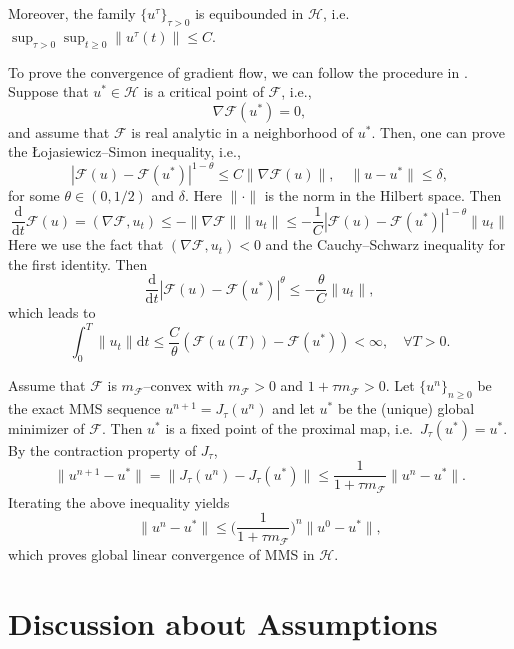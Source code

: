 \documentclass[twoside,11pt]{article}
\newcommand{\rev}[1]{#1}                           %
\newcommand{\dd}{\mathrm{d}}
\newcommand{\calF}{\mathcal{F}}
\begin{document}
Moreover, the family $\{u^\tau\}_{\tau>0}$ is equibounded in $\mathcal{H}$, i.e.
$\sup_{\tau>0}\sup_{t\ge0}\|u^\tau(t)\|\le C$.

To prove the convergence of gradient flow, we can follow the procedure in \citet{hauer2019kurdyka}. Suppose that \(u^{*}\in \mathcal{H}\) is a critical point of \(\mathcal{F}\), i.e.,
\[
\nabla \mathcal{F}(u^{*}) = 0,
\]
and assume that \(\mathcal{F}\) is real analytic in a neighborhood of \(u^{*}\).
Then, one can prove the \L{}ojasiewicz--Simon inequality, i.e., \begin{equation} |\mathcal{F}(u) - \mathcal{F}(u^*)|^{1 - \theta} \leq C \| \nabla \mathcal{F}(u) \| , \quad \|u - u^*\| \leq \delta, \end{equation} for some $\theta \in (0, 1/2)$ and $\delta$. Here $\| \cdot \|$ is the norm in the Hilbert space. Then \begin{equation} \frac{\dd}{\dd t} \mathcal{F}(u) = ( \nabla \mathcal{F}, u_t) \leq - \| \nabla \mathcal{F} \| \| u_t \| \leq -  \frac{1}{C} |\mathcal{F}(u) - \mathcal{F}(u^*)|^{1 - \theta} \|u_t \| \end{equation} Here we use the fact that $( \nabla \mathcal{F}, u_t) < 0$ and the Cauchy--Schwarz inequality for the first identity. Then
\begin{equation} \frac{\dd}{\dd t} |\mathcal{F}(u) - \mathcal{F}(u^*)|^{\theta} \leq - \frac{\theta}{C} \| u_t \|, \end{equation} which leads to \begin{equation} \int_{0}^T \|u_t \| \dd t \leq \frac{C}{\theta} (\mathcal{F}(u(T)) - \mathcal{F}(u^*) ) \rev{< \infty}, \quad \forall T\rev{> 0}. \end{equation}

Assume that $\calF$ is $m_{\mathcal F}$--convex with $m_{\mathcal F}>0$ and $1+\tau m_{\mathcal F}>0$.
Let $\{u^n\}_{n\ge 0}$ be the exact MMS sequence $u^{n+1}=J_\tau(u^n)$ and let $u^*$ be the (unique)
global minimizer of $\calF$. Then $u^*$ is a fixed point of the proximal map, i.e.\ $J_\tau(u^*)=u^*$.
By the contraction property of $J_\tau$,
\[
\|u^{n+1}-u^*\|
= \|J_\tau(u^n)-J_\tau(u^*)\|
\le \frac{1}{1+\tau m_{\mathcal F}} \|u^n-u^*\|.
\]
Iterating the above inequality yields
\[
\|u^{n}-u^*\|\le \Big(\frac{1}{1+\tau m_{\mathcal F}}\Big)^{n}\|u^0-u^*\|,
\]
which proves global linear convergence of MMS in $\mathcal H$.
\fi

\section{Discussion about Assumptions}
\end{document}
